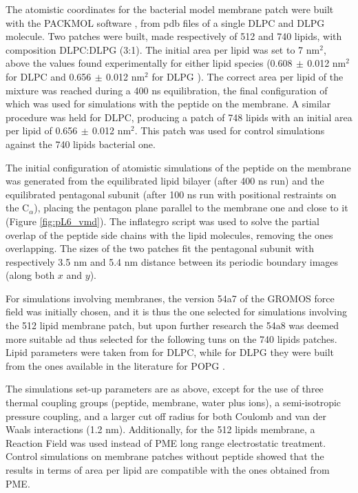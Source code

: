 The atomistic coordinates for the bacterial model membrane patch were built with the PACKMOL software \cite{Martinez2009}, from pdb files of a single DLPC \cite{PogerOrig} and DLPG \cite{Kukol2009} molecule. Two patches were built, made respectively of 512 and 740 lipids, with composition DLPC:DLPG (3:1). The initial area per lipid was set to 7 nm$^2$, above the values found experimentally for either lipid species (0.608$\,\pm\,$0.012 nm$^2$ for DLPC \cite{Kucerka2011} and 0.656$\,\pm\,$0.012 nm$^2$ for DLPG \cite{Pan2012}). The correct area per lipid of the mixture was reached during a 400 ns equilibration, the final configuration of which was used for simulations with the peptide on the membrane.
A similar procedure was held for DLPC, producing a patch of 748 lipids with an initial area per lipid of 0.656$\,\pm\,$0.012 nm$^2$. This patch was used for control simulations against the 740 lipids bacterial one.

The initial configuration of atomistic simulations of the peptide on the membrane was generated from the equilibrated lipid bilayer (after 400 ns run) and the equilibrated pentagonal subunit (after 100 ns run with positional restraints on the C$_\alpha$), placing the pentagon plane parallel to the membrane one and close to it (Figure \ref{fig:pL6_vmd}).
%
The inflategro \cite{Kandt2007} script was used to solve the partial overlap of the peptide side chains with the lipid molecules, removing the ones overlapping.
%
The sizes of the two patches fit the pentagonal subunit with respectively 3.5 nm and 5.4 nm distance between its periodic boundary images (along both $x$ and $y$).

For simulations involving membranes, the version 54a7 of the GROMOS force field \cite{Schmid2011} was initially chosen, and it is thus the one selected for simulations involving the 512 lipid membrane patch, but upon further research the 54a8 \cite{Oostenbrink2005, Reif2013} was deemed more suitable ad thus selected for the following tuns on the 740 lipids patches. Lipid parameters were taken from \cite{PogerOrig} for DLPC, while for DLPG they were built from the ones available in the literature for POPG \cite{Kukol2009}.

The simulations set-up parameters are as above, except for the use of three thermal coupling groups (peptide, membrane, water plus ions), a semi-isotropic pressure coupling, and a larger cut off radius for both Coulomb and van der Waals interactions (1.2 nm). Additionally, for the 512 lipids membrane, a Reaction Field \cite{Tironi1995} was used instead of PME long range electrostatic treatment. Control simulations on membrane patches without peptide showed that the results in terms of area per lipid are compatible with the ones obtained from PME.

